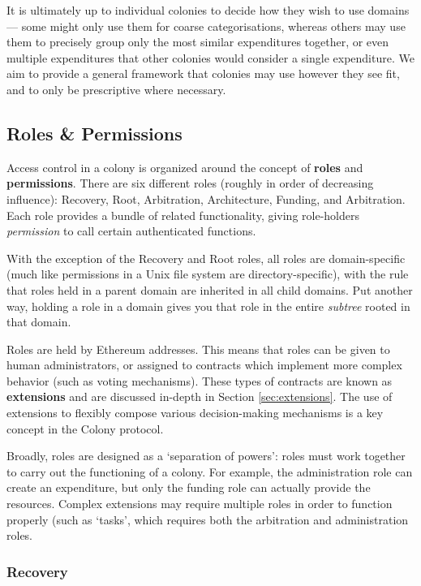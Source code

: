 It is ultimately up to individual colonies to decide how they wish to use domains --- some might only use them for coarse categorisations, whereas others may use them to precisely group only the most similar expenditures together, or even multiple expenditures that other colonies would consider a single expenditure. We aim to provide a general framework that colonies may use however they see fit, and to only be prescriptive where necessary.

\subsection{Roles \& Permissions}\label{sec:roles}

Access control in a colony is organized around the concept of \textbf{roles} and \textbf{permissions}. There are six different roles (roughly in order of decreasing influence): Recovery, Root, Arbitration, Architecture, Funding, and Arbitration. Each role provides a bundle of related functionality, giving role-holders \textit{permission} to call certain authenticated functions.

With the exception of the Recovery and Root roles, all roles are domain-specific (much like permissions in a Unix file system are directory-specific), with the rule that roles held in a parent domain are inherited in all child domains. Put another way, holding a role in a domain gives you that role in the entire \textit{subtree} rooted in that domain.

Roles are held by Ethereum addresses. This means that roles can be given to human administrators, or assigned to contracts which implement more complex behavior (such as voting mechanisms). These types of contracts are known as \textbf{extensions} and are discussed in-depth in Section \ref{sec:extensions}. The use of extensions to flexibly compose various decision-making mechanisms is a key concept in the Colony protocol.

Broadly, roles are designed as a `separation of powers': roles must work together to carry out the functioning of a colony. For example, the administration role can create an expenditure, but only the funding role can actually provide the resources. Complex extensions may require multiple roles in order to function properly (such as `tasks', which requires both the arbitration and administration roles.

\subsubsection{Recovery}

